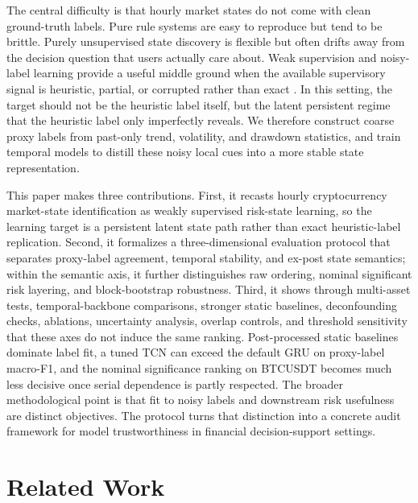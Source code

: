 \documentclass[a4paper,fleqn]{cas-dc}
\begin{document}
The central difficulty is that hourly market states do not come with clean ground-truth labels. Pure rule systems are easy to reproduce but tend to be brittle. Purely unsupervised state discovery is flexible but often drifts away from the decision question that users actually care about. Weak supervision and noisy-label learning provide a useful middle ground when the available supervisory signal is heuristic, partial, or corrupted rather than exact \cite{ratner2020snorkel,zhang2022programmatic,zhou2018weakly,natarajan2013noisy,frenay2014labelnoise,song2023noisylabels}. In this setting, the target should not be the heuristic label itself, but the latent persistent regime that the heuristic label only imperfectly reveals. We therefore construct coarse proxy labels from past-only trend, volatility, and drawdown statistics, and train temporal models to distill these noisy local cues into a more stable state representation.

This paper makes three contributions. First, it recasts hourly cryptocurrency market-state identification as weakly supervised risk-state learning, so the learning target is a persistent latent state path rather than exact heuristic-label replication. Second, it formalizes a three-dimensional evaluation protocol that separates proxy-label agreement, temporal stability, and ex-post state semantics; within the semantic axis, it further distinguishes raw ordering, nominal significant risk layering, and block-bootstrap robustness. Third, it shows through multi-asset tests, temporal-backbone comparisons, stronger static baselines, deconfounding checks, ablations, uncertainty analysis, overlap controls, and threshold sensitivity that these axes do not induce the same ranking. Post-processed static baselines dominate label fit, a tuned TCN can exceed the default GRU on proxy-label macro-F1, and the nominal significance ranking on BTCUSDT becomes much less decisive once serial dependence is partly respected. The broader methodological point is that fit to noisy labels and downstream risk usefulness are distinct objectives. The protocol turns that distinction into a concrete audit framework for model trustworthiness in financial decision-support settings.

\section{Related Work}
\end{document}
